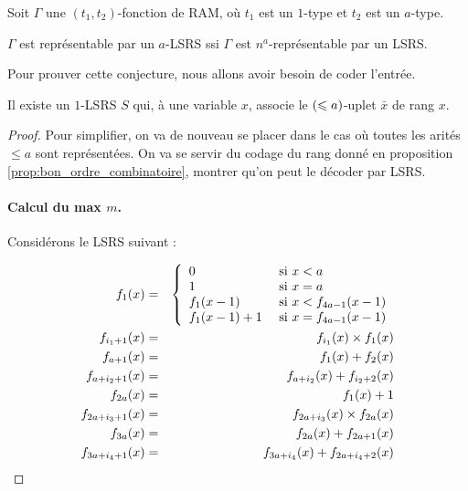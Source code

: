 	\begin{conj}
		Soit $\Gamma$ une $(t_1,t_2)$-fonction de RAM, où $t_1$ est un $1$-type et $t_2$ est un $a$-type.
		
		$\Gamma$ est représentable par un $a$-LSRS ssi $\Gamma$ est $n^a$-représentable par un LSRS.
	\end{conj}
		
	Pour prouver cette conjecture, nous allons avoir besoin de coder l'entrée.
	
	\begin{lemma}
		\label{lem:decomp_rang_par_LSRS}
		
		Il existe un $1$-LSRS $S$ qui, à une variable $x$, associe le $\left( \leqslant a \right)$-uplet $\bar{x}$ de rang $x$. 
	\end{lemma}
		
	\begin{proof}
		Pour simplifier, on va de nouveau se placer dans le cas où toutes les arités $\leqslant a$ sont représentées\footnotemark. On va se servir du codage du rang donné en proposition \ref{prop:bon_ordre_combinatoire}, montrer qu'on peut le décoder par LSRS.
		
			
		\paragraph{Calcul du max $m$.}
			\label{par:calcul_max_bon_ordre}
			Considérons le LSRS suivant :
			
				\begin{eqnarray}
					f_1(x) & = & \left\lbrace \begin{array}{ll} 	
									0 & \text{ si $x < a$} \\
									1 & \text{ si $x = a$} \\
									f_1(x-1) & \text{ si $x < f_{4a-1}(x-1)$} \\
									f_1(x-1)+1 & \text{ si $x = f_{4a-1}(x-1)$}
									 \end{array} \right. 
									\label{eqn:f_0_max_courant}\\
					f_{i_1 + 1}(x) & = & f_{i_1}(x) \times f_1(x) \label{eqn:m_pow_i}\\
					f_{a + 1}(x) & = & f_{1}(x) + f_{2}(x) \label{eqn:sum_m_pow_init}\\
					f_{a + i_2 + 1}(x) & = & f_{a + i_2}(x) + f_{i_2 + 2}(x) \label{eqn:sum_m_pow}\\
					f_{2a}(x) & = & f_1(x) + 1 \label{eqn:m_plus_1}\\
					f_{2a + i_3 + 1}(x) & = & f_{2a + i_3}(x) \times f_{2a}(x) \label{eqn:m1_pow_i}\\
					f_{3a}(x) & = & f_{2a}(x) + f_{2a + 1}(x) \label{eqn:sum_m1_pow_init}\\
					f_{3a + i_4 + 1}(x) & = & f_{3a + i_4}(x) + f_{2a + i_4+2}(x) \label{eqn:sum_m1_pow}
				\end{eqnarray}
		

\end{proof}
